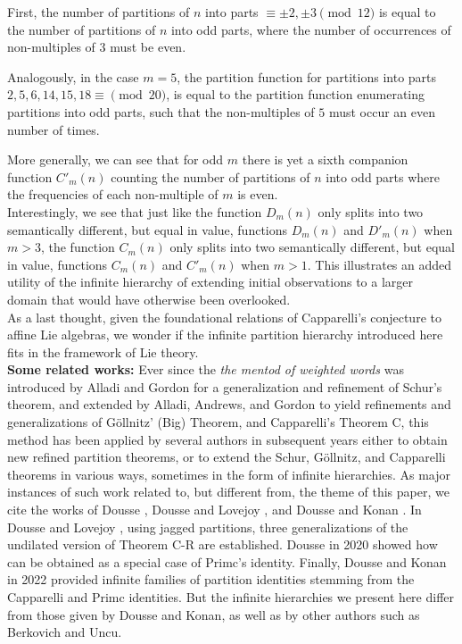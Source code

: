 \documentclass[12pt,a4paper]{amsart}
\theoremstyle{definition}
\theoremstyle{notation}
\theoremstyle{corollary}
\begin{document}
First, the number of partitions of $n$ into parts $ \equiv\pm 2, \pm 3\pmod{12}$ is equal to the number of partitions of $n$ into odd parts, where the number of occurrences of non-multiples of $3$ must be even. 

Analogously, in the case $m=5$, the partition function for partitions into parts $2,5,6,14,15, 18\equiv \pmod{20}$, is equal to the partition function enumerating partitions into odd parts, such that the non-multiples of $5$ must occur an even number of times.

More generally, we can see that for odd $m$ there is yet a sixth companion function $C'_m(n)$ counting the number of partitions of $n$ into odd parts where the frequencies of each non-multiple of $m$ is even.\\

Interestingly, we see that just like the function $D_m(n)$ only splits into two semantically different, but equal in value, functions $D_m(n)$ and $D'_m(n)$ when $m>3$, the function $C_m(n)$ only splits into two semantically different, but equal in value, functions $C_m(n)$ and $C'_m(n)$ when $m>1$. This illustrates an added utility of the infinite hierarchy of extending initial observations to a larger domain that would have otherwise been overlooked.\\

As a last thought, given the foundational relations of Capparelli's conjecture to affine Lie algebras, we wonder if the infinite partition hierarchy introduced here fits in the framework of Lie theory.\\



{\bf{Some related works:}} Ever since the {\it{the mentod of weighted words}} was introduced by Alladi and Gordon \cite{KABG93} for a generalization and refinement of Schur's theorem, and extended by Alladi, Andrews, and Gordon to yield \cite{KAGEABG95G} refinements and generalizations of G\"ollnitz' (Big) Theorem, and Capparelli's Theorem C, this method has been applied by several authors in subsequent years either to obtain new refined partition theorems, or to extend the Schur, G\"ollnitz, and Capparelli theorems in various ways, sometimes in the form of infinite hierarchies. As major instances of such work related to, but different from, the theme of this paper, we cite the works of Dousse \cite{JD20}, Dousse and Lovejoy \cite{JDJL19}, and Dousse and Konan \cite{JDIK22}. In Dousse and Lovejoy \cite{JDJL19}, using jagged partitions, three generalizations of the undilated version of Theorem C-R are established. Dousse \cite{JD20} in 2020 showed how \cite[Thm.~3]{KAGEABG95} can be obtained as a special case of Primc's identity. Finally, Dousse and Konan \cite{JDIK22} in 2022 provided infinite families of partition identities stemming from the Capparelli and Primc identities. But the infinite hierarchies we present here differ from those given by Dousse and Konan, as well as by other authors such as Berkovich and Uncu.
\end{document}
